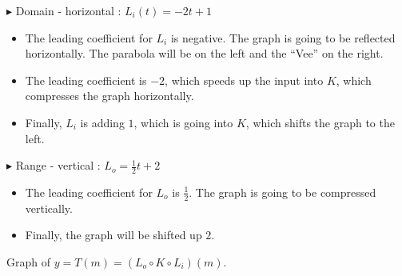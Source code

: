 \documentclass{ximera}
\begin{document}
$\blacktriangleright$ Domain - horizontal : $L_i(t) = -2t + 1$


\begin{itemize}
\item The leading coefficient for $L_i$ is negative.  The graph is going to be reflected horizontally. 
The parabola will be on the left and the ``Vee'' on the right.
\item The leading coefficient is $-2$, which speeds up the input into $K$, which compresses the graph horizontally.
\item Finally, $L_i$ is adding $1$, which is going into $K$, which shifts the graph to the left.

\end{itemize}





$\blacktriangleright$ Range - vertical : $L_o = \frac{1}{2}t + 2$


\begin{itemize}
\item The leading coefficient for $L_o$ is $\frac{1}{2}$.  The graph is going to be compressed vertically. \\
\item Finally, the graph will be shifted up $2$.

\end{itemize}


Graph of $ y = T(m) = (L_o \circ K \circ L_i)(m)$.
\end{document}
